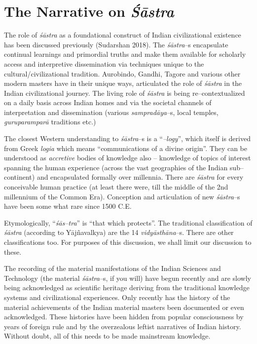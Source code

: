 \section*{The Narrative on \textit{Śāstra}}

The role of \textit{śāstra} as a foundational construct of Indian civilizational existence has been discussed previously (Sudarshan 2018). The \textit{śāstra}–s encapsulate continual learnings and primordial truths and make them available for scholarly access and interpretive dissemination via techniques unique to the cultural/civilizational tradition. Aurobindo, Gandhi, Tagore and various other modern masters have in their unique ways, articulated the role of \textit{śāstra} in the Indian civilizational journey. The living role of \textit{śāstra} is being re–contextualized on a daily basis across Indian homes and via the societal channels of interpretation and dissemination (various \textit{sampradāya}–s, local temples, \textit{guruparamparā} traditions etc.)

The closest Western understanding to \textit{śāstra}–s is a “\textit{–logy}”, which itself is derived from Greek \textit{logia} which means “communications of a divine origin”. They can be understood as \textit{accretive} bodies of knowledge also – knowledge of topics of interest spanning the human experience (across the vast geographies of the Indian sub–continent) and encapsulated formally over millennia. There are \textit{śāstra} for every conceivable human practice (at least there were, till the middle of the 2nd millennium of the Common Era). Conception and articulation of new \textit{śāstra}–s have been some what rare since 1500 C.E.

Etymologically, “\textit{śās–tra}” is “that which protects”. The traditional classification of \textit{śāstra} (according to Yājñavalkya) are the 14 \textit{vidyāsthāna}–s. There are other classifications too. For purposes of this discussion, we shall limit our discussion to these.

The recording of the material manifestations of the Indian Sciences and Technology (the material \textit{śāstra}–s, if you will) have begun recently and are slowly being acknowledged as scientific heritage deriving from the traditional knowledge systems and civilizational experiences. Only recently has the history of the material achievements of the Indian material masters been documented or even acknowledged. These histories have been hidden from popular consciousness by years of foreign rule and by the overzealous leftist narratives of Indian history. Without doubt, all of this needs to be made mainstream knowledge.

